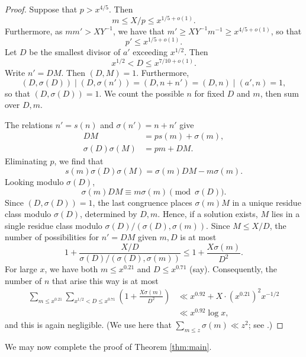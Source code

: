 \documentclass[11pt]{amsart}
\begin{document}
\begin{proof}
Suppose that $p>x^{4/5}$. Then
    \[
     m\le X/p\le x^{1/5+o(1)}.
    \]
    Furthermore, as $mm'>XY^{-1}$, we have that $m'\ge XY^{-1}m^{-1}\ge x^{4/5+o(1)}$, so that
    \[
     p'\le x^{1/5+o(1)}.
    \]
    Let $D$ be the smallest divisor of $a'$ exceeding $x^{1/2}$. Then
    \[
     x^{1/2}<D\le x^{7/10+o(1)}.
    \]
    Write $n'=DM$. Then $(D,M)=1$. Furthermore,
    \[
     (D,\sigma(D))\mid(D,\sigma(n'))=(D,n+n')=(D,n)\mid(a',n)=1,
    \]
    so that $(D,\sigma(D))=1$. We count the possible $n$ for fixed $D$ and $m$, then sum over $D,m$.
    
    The relations $n'=s(n)$ and $\sigma(n')=n+n'$ give
    \begin{align*}
     DM&=ps(m)+\sigma(m),\\
     \sigma(D)\sigma(M)&=pm+DM.
    \end{align*}
    Eliminating $p$, we find that
    \[
     s(m)\sigma(D)\sigma(M)=\sigma(m)DM-m\sigma(m).
    \]
    Looking modulo $\sigma(D)$,
    \[
     \sigma(m)DM\equiv m\sigma(m)\pmod{\sigma(D)}.
    \] 
    Since $(D,\sigma(D))=1$, the last congruence places $\sigma(m)M$ in a unique residue class modulo $\sigma(D)$, determined by $D,m$. Hence, if a solution exists, $M$ lies in a single residue class modulo $\sigma(D)/(\sigma(D),\sigma(m))$. Since $M\le X/D$, the number of possibilities for $n'=DM$ given $m,D$ is at most
    \[
     1+\frac{X/D}{\sigma(D)/(\sigma(D),\sigma(m))}
     \le1+\frac{X\sigma(m)}{D^2}.
    \]
    For large $x$, we have both $m\le x^{0.21}$ and $D\le x^{0.71}$ (say). Consequently, the number of $n$ that arise this way is at most
    \[
    \begin{aligned}
     \sum_{m\le x^{0.21}}\sum_{x^{1/2}<D\le x^{0.71}}
     \left(1+\frac{X\sigma(m)}{D^2}\right)
     &\ll x^{0.92}+X\cdot(x^{0.21})^2x^{-1/2}\\
     &\ll x^{0.92}\log x,
    \end{aligned}
    \]
    and this is again negligible. (We use here that
    $\sum_{m\le z}\sigma(m)\ll z^2$; see \cite[Theorem 324, p.~351]{HardyWright2008}.) \end{proof}
    

We may now complete the proof of Theorem \ref{thm:main}.
\end{document}

